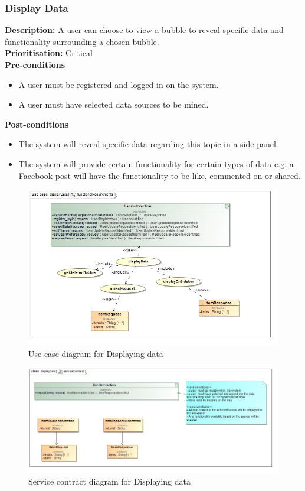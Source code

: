 \documentclass[hidelinks,english]{article}
\begin{document}
    		\subsubsection{Display Data}
				\textbf{Description:}  A user can choose to view a bubble to reveal specific data and functionality surrounding a chosen bubble.\\
			    \textbf{Prioritisation:} Critical\\
			    \textbf{Pre-conditions}
			    \begin{itemize}
			        \item A user must be registered and logged in on the system.
			        \item A user must have selected data sources to be mined.
			    \end{itemize}
				\textbf{Post-conditions}
				\begin{itemize}
					\item The system will reveal specific data regarding this topic in a side panel.
					\item The system will provide certain functionality for certain types of data e.g. a Facebook post will have the functionality to be like, commented on or shared.
				\end{itemize}
				
			\begin{figure}[!h]
    			\includegraphics[width=\linewidth]{displayDataFunctionalRequirements.jpg}
    			\caption{Use case diagram for Displaying data}
    			\label{UseCaseDisplayData}
    			\end{figure}
    			
    			\begin{figure}[!h]
    			\includegraphics[width=\linewidth]{displayDataServiceContract.jpg}
    			\caption{Service contract diagram for Displaying data}
    			\label{ServiceContractDisplayData}
    			\end{figure}
				
\end{document}
